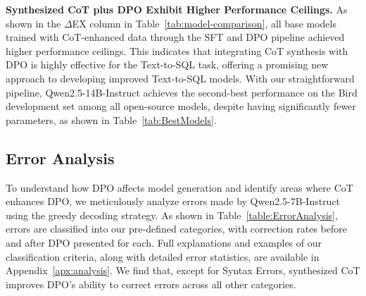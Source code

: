 

\textbf{Synthesized CoT plus DPO Exhibit Higher Performance Ceilings.} 
As shown in the $\Delta$EX column in Table~\ref{tab:model-comparison}, all base models trained with CoT-enhanced data through the SFT and DPO pipeline achieved higher performance ceilings. This indicates that integrating CoT synthesis with DPO is highly effective for the Text-to-SQL task, offering a promising new approach to developing improved Text-to-SQL models. With our straightforward pipeline, Qwen2.5-14B-Instruct achieves the second-best performance on the Bird development set among all open-source models, despite having significantly fewer parameters, as shown in Table~\ref{tab:BestModels}.



\subsection{Error Analysis}\label{sec:errorAnalysis}

To understand how DPO affects model generation and identify areas where CoT enhances DPO, we meticulously analyze errors made by Qwen2.5-7B-Instruct using the greedy decoding strategy. As shown in Table~\ref{table:ErrorAnalysis}, errors are classified into our pre-defined categories, with correction rates before and after DPO presented for each. Full explanations and examples of our classification criteria, along with detailed error statistics, are available in Appendix~\ref{apx:analysis}. We find that, except for Syntax Errors, synthesized CoT improves DPO's ability to correct errors across all other categories.


